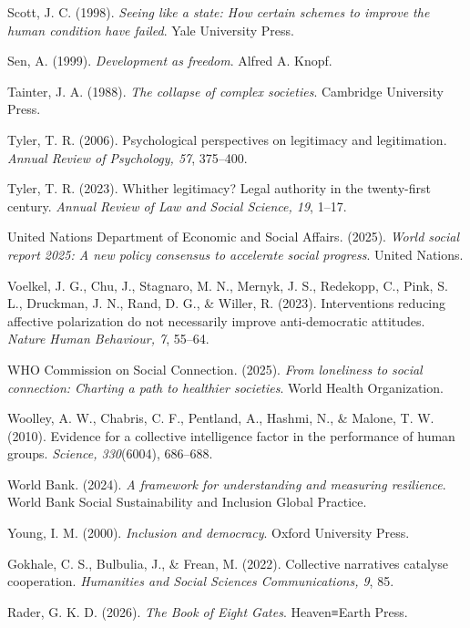 \documentclass[
  11pt,
]{article}
\begin{document}
Scott, J. C. (1998). \emph{Seeing like a state: How certain schemes to
improve the human condition have failed}. Yale University Press.

Sen, A. (1999). \emph{Development as freedom}. Alfred A. Knopf.

Tainter, J. A. (1988). \emph{The collapse of complex societies}.
Cambridge University Press.

Tyler, T. R. (2006). Psychological perspectives on legitimacy and
legitimation. \emph{Annual Review of Psychology, 57}, 375--400.

Tyler, T. R. (2023). Whither legitimacy? Legal authority in the
twenty-first century. \emph{Annual Review of Law and Social Science,
19}, 1--17.

United Nations Department of Economic and Social Affairs. (2025).
\emph{World social report 2025: A new policy consensus to accelerate
social progress}. United Nations.

Voelkel, J. G., Chu, J., Stagnaro, M. N., Mernyk, J. S., Redekopp, C.,
Pink, S. L., Druckman, J. N., Rand, D. G., \& Willer, R. (2023).
Interventions reducing affective polarization do not necessarily improve
anti-democratic attitudes. \emph{Nature Human Behaviour, 7}, 55--64.

WHO Commission on Social Connection. (2025). \emph{From loneliness to
social connection: Charting a path to healthier societies}. World Health
Organization.

Woolley, A. W., Chabris, C. F., Pentland, A., Hashmi, N., \& Malone, T.
W. (2010). Evidence for a collective intelligence factor in the
performance of human groups. \emph{Science, 330}(6004), 686--688.

World Bank. (2024). \emph{A framework for understanding and measuring
resilience}. World Bank Social Sustainability and Inclusion Global
Practice.

Young, I. M. (2000). \emph{Inclusion and democracy}. Oxford University
Press.

Gokhale, C. S., Bulbulia, J., \& Frean, M. (2022). Collective narratives
catalyse cooperation. \emph{Humanities and Social Sciences
Communications, 9}, 85.

Rader, G. K. D. (2026). \emph{The Book of Eight Gates}. Heaven≡Earth
Press.
\end{document}
